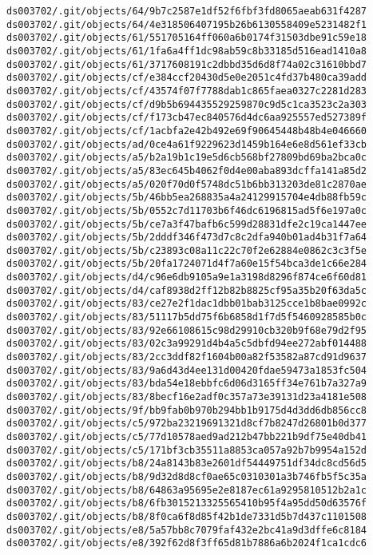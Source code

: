 \documentclass[11pt]{article}
\begin{document}
\begin{Verbatim}[commandchars=\\\{\}]
ds003702/.git/objects/64/9b7c2587e1df52f6fbf3fd8065aeab631f4287
ds003702/.git/objects/64/4e318506407195b26b6130558409e5231482f1
ds003702/.git/objects/61/551705164ff060a6b0174f31503dbe91c59e18
ds003702/.git/objects/61/1fa6a4ff1dc98ab59c8b33185d516ead1410a8
ds003702/.git/objects/61/3717608191c2dbbd35d6d8f74a02c31610bbd7
ds003702/.git/objects/cf/e384ccf20430d5e0e2051c4fd37b480ca39add
ds003702/.git/objects/cf/43574f07f7788dab1c865faea0327c2281d283
ds003702/.git/objects/cf/d9b5b694435529259870c9d5c1ca3523c2a303
ds003702/.git/objects/cf/f173cb47ec840576d4dc6aa925557ed527389f
ds003702/.git/objects/cf/1acbfa2e42b492e69f90645448b48b4e046660
ds003702/.git/objects/ad/0ce4a61f9229623d1459b164e6e8d561ef33cb
ds003702/.git/objects/a5/b2a19b1c19e5d6cb568bf27809bd69ba2bca0c
ds003702/.git/objects/a5/83ec645b4062f0d4e00aba893dcffa141a85d2
ds003702/.git/objects/a5/020f70d0f5748dc51b6bb313203de81c2870ae
ds003702/.git/objects/5b/46bb5ea268835a4a24129915704e4db88fb59c
ds003702/.git/objects/5b/0552c7d11703b6f46dc6196815ad5f6e197a0c
ds003702/.git/objects/5b/ce7a3f47bafb6c599d28831dfe2c19ca1447ee
ds003702/.git/objects/5b/2dddf346f473d7c8c2dfa940b01ad4b31f7a64
ds003702/.git/objects/5b/c23893c08a11c22c70f2e62884e0862c3c3f5e
ds003702/.git/objects/5b/20fa1724071d4f7a60e15f54bca3de1c66e284
ds003702/.git/objects/d4/c96e6db9105a9e1a3198d8296f874ce6f60d81
ds003702/.git/objects/d4/caf8938d2ff12b82b8825cf95a35b20f63da5c
ds003702/.git/objects/83/ce27e2f1dac1dbb01bab3125cce1b8bae0992c
ds003702/.git/objects/83/51117b5dd75f6b6858d1f7d5f5460928585b0c
ds003702/.git/objects/83/92e66108615c98d29910cb320b9f68e79d2f95
ds003702/.git/objects/83/02c3a99291d4b4a5c5dbfd94ee272abf014488
ds003702/.git/objects/83/2cc3ddf82f1604b00a82f53582a87cd91d9637
ds003702/.git/objects/83/9a6d43d4ee131d00420fdae59473a1853fc504
ds003702/.git/objects/83/bda54e18ebbfc6d06d3165ff34e761b7a327a9
ds003702/.git/objects/83/8becf16e2adf0c357a73e39131d23a4181e508
ds003702/.git/objects/9f/bb9fab0b970b294bb1b9175d4d3dd6db856cc8
ds003702/.git/objects/c5/972ba23219691321d8cf7b8247d26801b0d377
ds003702/.git/objects/c5/77d10578aed9ad212b47bb221b9df75e40db41
ds003702/.git/objects/c5/171bf3cb35511a8853ca057a92b7b9954a152d
ds003702/.git/objects/b8/24a8143b83e2601df54449751df34dc8cd56d5
ds003702/.git/objects/b8/9d32d8d8cf0ae65c0310301a3b746fb5f5c35a
ds003702/.git/objects/b8/64863a95695e2e8187ec61a9295810512b2a1c
ds003702/.git/objects/b8/6fb3015213325565410b95f4a95dd50d63576f
ds003702/.git/objects/b8/8f0ca6f8d85f42b1de7331d5b7d437c1101508
ds003702/.git/objects/e8/5a57bb8c7079faf432e2bc41a9d3dffe6c8184
ds003702/.git/objects/e8/392f62d8f3ff65d81b7886a6b2024f1ca1cdc6

\end{Verbatim}
\end{document}
